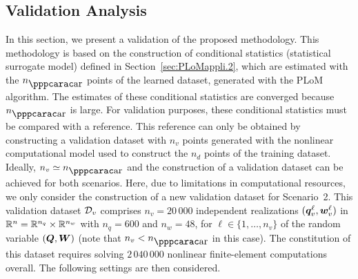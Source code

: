 \subsection{Validation Analysis}
\label{sec:PLoMappli.4}
%
In this section, we present a validation of the proposed methodology. This methodology is based on the construction of conditional statistics (statistical surrogate model) defined in Section~\ref{sec:PLoMappli.2}, which are estimated with the $n_\ar$ points of the learned dataset, generated with the PLoM algorithm. The estimates of these  conditional statistics are converged because $n_\ar$ is large. For validation purposes, these conditional statistics must be compared with a reference. This reference can only be obtained by constructing a validation dataset with $n_v$ points generated with the nonlinear computational model used to construct the $n_d$ points of the training dataset. Ideally, $n_v\simeq n_\ar$ and the construction of a validation dataset can be achieved for both scenarios. 
%
Here, due to limitations in computational resources, we only consider the construction of a new validation dataset for Scenario~2. This validation dataset ${\mathcal{D}}_v$ comprises $n_v =20\,000$ independent realizations $({\boldsymbol{q}}_v^\ell,{\boldsymbol{w}}_v^\ell)$ in ${\mathbb{R}}^{n} = {\mathbb{R}}^{n_q}\times {\mathbb{R}}^{n_w}$ with $n_q=600$ and $n_w=48$, for $\ell\in\{1,\ldots , n_v\}$ of the random variable $({\boldsymbol{Q}},{\boldsymbol{W}})$ (note that $n_v < n_\ar$ in this case). The constitution of this dataset requires solving $2\,040\,000$ nonlinear finite-element computations overall. The following settings are then considered.
